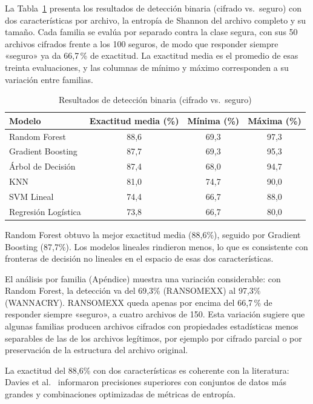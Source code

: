 La Tabla~\ref{tab:exp1} presenta los resultados de detección binaria (cifrado vs.\ seguro) con dos características por archivo, la entropía de Shannon del archivo completo y su tamaño. Cada familia se evalúa por separado contra la clase segura, con sus 50 archivos cifrados frente a los 100 seguros, de modo que responder siempre «seguro» ya da 66,7\,\% de exactitud. La exactitud media es el promedio de esas treinta evaluaciones, y las columnas de mínimo y máximo corresponden a su variación entre familias.

\begin{table}[ht]
\centering
\caption{Resultados de detección binaria (cifrado vs.\ seguro)}
\label{tab:exp1}
\begin{tabular}{|l|c|c|c|}
\hline
\textbf{Modelo} & \textbf{Exactitud media (\%)} & \textbf{Mínima (\%)} & \textbf{Máxima (\%)} \\ \hline
Random Forest & 88,6 & 69,3 & 97,3 \\ \hline
Gradient Boosting & 87,7 & 69,3 & 95,3 \\ \hline
Árbol de Decisión & 87,4 & 68,0 & 94,7 \\ \hline
KNN & 81,0 & 74,7 & 90,0 \\ \hline
SVM Lineal & 74,4 & 66,7 & 88,0 \\ \hline
Regresión Logística & 73,8 & 66,7 & 80,0 \\ \hline
\end{tabular}
\end{table}

Random Forest obtuvo la mejor exactitud media (88,6\%), seguido por Gradient Boosting (87,7\%). Los modelos lineales rindieron menos, lo que es consistente con fronteras de decisión no lineales en el espacio de esas dos características.

El análisis por familia (Apéndice) muestra una variación considerable: con Random Forest, la detección va del 69,3\% (RANSOMEXX) al 97,3\% (WANNACRY). RANSOMEXX queda apenas por encima del 66,7\,\% de responder siempre «seguro», a cuatro archivos de 150. Esta variación sugiere que algunas familias producen archivos cifrados con propiedades estadísticas menos separables de las de los archivos legítimos, por ejemplo por cifrado parcial o por preservación de la estructura del archivo original.

La exactitud del 88,6\% con dos características es coherente con la literatura: Davies et al.~\cite{paper_4_comparison_of_entropy} informaron precisiones superiores con conjuntos de datos más grandes y combinaciones optimizadas de métricas de entropía.

